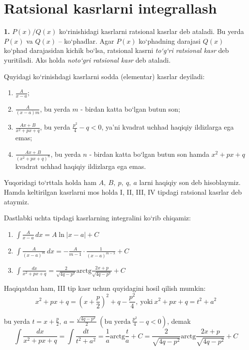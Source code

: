 \section{Ratsional kasrlarni integrallash}
\textbf{1.} $P(x)/Q(x)$ ko`rinishidagi kasrlarni ratsional kasrlar deb ataladi. Bu yerda $P(x)$ va $Q(x)$ -- ko`phadlar. Agar $P(x)$ ko`phadning darajasi $Q(x)$ ko`phad darajasidan kichik bo`lsa, ratsional kasrni \textit{to`g`ri ratsional kasr}  deb yuritiladi. Aks holda \textit{noto`gri ratsional kasr} deb ataladi.

Quyidagi ko`rinishdagi kasrlarni sodda (elementar) kasrlar deyiladi:

\begin{enumerate}[label=\Roman*]
	\item $\frac{A}{x-a}$;
	\item $\frac{A}{(x-a)m}$, bu yerda $m$ - birdan katta bo`lgan butun son;
	\item $\frac{Ax+B}{x^2+px+q}$, bu yerda $\frac{p^2}{4}-q<0$, ya'ni kvadrat uchhad haqiqiy ildizlarga ega emas;
	\item $\frac{Ax+B}{(x^2+px+q)^n}$, bu yerda $n$ - birdan katta bo`lgan butun son hamda $x^2+px+q$ kvadrat uchhad haqiqiy ildizlarga ega emas.	
\end{enumerate}



Yuqoridagi to`rttala holda ham $A,\ B,\ p,\ q,\ a$ larni haqiqiy son deb hisoblaymiz. Hamda keltirilgan kasrlarni mos holda I, II, III, IV tipdagi ratsional kasrlar deb ataymiz.

Dastlabki uchta tipdagi kasrlarning integralini ko`rib chiqamiz:

\begin{enumerate}[label=\Roman*]
	\item $\int\frac{A}{x-a}\,dx=A\ln|x-a|+C$
	\item $\int\frac{A}{(x-a)^m}\,dx=-\frac{A}{m-1}\cdot\frac{1}{(x-a)^{m-\lambda}}+C$
	\item $\int\frac{dx}{x^2+px+q}=\frac{2}{\sqrt{4q-p^2}}\mbox{arctg}\frac{2x+p}{\sqrt{4q-p^2}}+C$
\end{enumerate}

Haqiqatdan ham, III tip kasr uchun quyidagini hosil qilish mumkin:
$$x^2+px+q=\left(x+\frac{p}{2}\right)^2+q-\frac{p^2}{4},\ \mbox{yoki}\ x^2+px+q=t^2+a^2$$

bu yerda $t=x+\frac{p}{2},\ a=\frac{\sqrt{4q-p^2}}{2}\ \left(\mbox{bu yerda}\ \frac{p^2}{4}-q<0\right)$,  demak
$$\int\frac{dx}{x^2+px+q}=\int\frac{dt}{t^2+a^2}=\frac{1}{a}\mbox{arctg}\frac{t}{a}+C=\frac{2}{\sqrt{4q-p^2}}\mbox{arctg}\frac{2x+p}{\sqrt{4q-p^2}}+C$$

